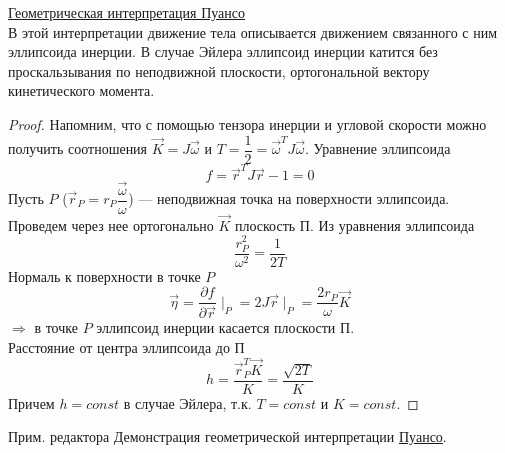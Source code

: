 \underline{Геометрическая интерпретация Пуансо}\\
В этой интерпретации движение тела описывается движением связанного с ним эллипсоида инерции. В случае Эйлера эллипсоид инерции катится без проскальзывания по неподвижной плоскости, ортогональной вектору кинетического момента.\\
\begin{proof}
    Напомним, что с помощью тензора инерции и угловой скорости можно получить соотношения $\vec{K} = J\vec{\omega}$ и $T = \dfrac{1}{2} = \vec{\omega}^TJ\vec{\omega}$. Уравнение эллипсоида
    \[
    f = \vec{r}^TJ\vec{r} - 1 = 0
    \]
    Пусть $P$ ($\vec{r}_P = r_P\dfrac{\vec{\omega}}{\omega}$) --- неподвижная точка на поверхности эллипсоида. Проведем через нее ортогонально $\vec{K}$ плоскость П. Из уравнения эллипсоида
    \[
    \dfrac{r_P^2}{\omega^2} = \dfrac{1}{2T}
    \]
    Нормаль к поверхности в точке $P$
    \[
    \vec{\eta} = \dfrac{\partial f}{\partial \vec{r}}\mid_P = 2J\vec{r}\mid_P = \dfrac{2r_P}{\omega}\vec{K}
    \]
    $\Longrightarrow$ в точке $P$ эллипсоид инерции касается плоскости П.\\

    Расстояние от центра эллипсоида до П
    \[
    h = \dfrac{\vec{r}_P^T\vec{K}}{K} = \dfrac{\sqrt{2T}}{K}
    \]
    Причем $h = const$ в случае Эйлера, т.к. $T = const$ и $K = const$.
\end{proof}

\begin{frame}{Прим. редактора}
    Демонстрация геометрической интерпретации \href{https://www.youtube.com/watch?v=BwYFT3T5uIw}{Пуансо}.
\end{frame}
